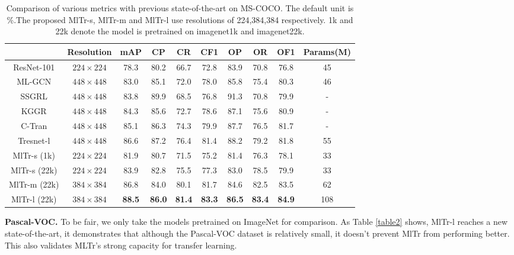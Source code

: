 \documentclass{article} \usepackage[numbers,sort&compress]{natbib}
\begin{document}
\begin{table*}
\caption{Comparison of various metrics with previous state-of-the-art on MS-COCO. The default unit is \%.The proposed MlTr-s, MlTr-m and MlTr-l use resolutions of 224,384,384 respectively. 1k and 22k denote the model is pretrained on imagenet1k and imagenet22k.}
\label{table1}
\centering
\begin{tabular}{|c||c|c|c|c|c|c|c|c|c|}
\hline
\  & Resolution &mAP & CP & CR & CF1 & OP & OR & OF1 &Params(M) \\
\hline
\hline
ResNet-101 \cite{he2016deep} &$224\times224$ &78.3 &80.2 &66.7 &72.8  &83.9 &70.8 &76.8 &45\\
ML-GCN \cite{chen2019multi} &$448\times448$ &83.0 &85.1 &72.0 &78.0 &85.8 &75.4 &80.3   &46\\
SSGRL \cite{chen2019learning}  &$448\times448$ &83.8 &89.9 &68.5 &76.8 &91.3 &70.8 &79.9   &-\\
KGGR \cite{chen2020knowledge}   &$448\times448$ &84.3 &85.6 &72.7 &78.6 &87.1 &75.6 &80.9   &-\\
C-Tran \cite{lanchantin2020general} &$448\times448$ &85.1 &86.3 &74.3 &79.9 &87.7 &76.5 &81.7   &-\\
Tresnet-l \cite{ben2020asymmetric} &$448\times448$ &86.6 &87.2 &76.4 &81.4 &88.2 &79.2 &81.8  &55\\
\hline
\hline
MlTr-s (1k) &$224\times224$ &81.9 &80.7 &71.5 &75.2 &81.4 &76.3 &78.1   &33\\
MlTr-s (22k) &$224\times224$ &83.9 &82.8 &75.5 &77.3 &83.0 &78.5 &79.9 &33\\
MlTr-m (22k)&$384\times384$ &86.8 &84.0 &80.1 &81.7 &84.6 &82.5 &83.5   &62\\
MlTr-l (22k)&$384\times384$ &\textbf{88.5} &\textbf{86.0} &\textbf{81.4} &\textbf{83.3} &\textbf{86.5} &\textbf{83.4} &\textbf{84.9}   &108\\
\hline
\end{tabular}
\end{table*}

\textbf{Pascal-VOC.}
To be fair, we only take the models pretrained on ImageNet for comparison. As Table \textcolor{red}{\ref{table2}} shows, MlTr-l reaches a new state-of-the-art, it demonstrates that although the Pascal-VOC dataset is relatively small, it doesn't prevent MlTr from performing better. This also validates MLTr's strong capacity for transfer learning. 
\end{document}
